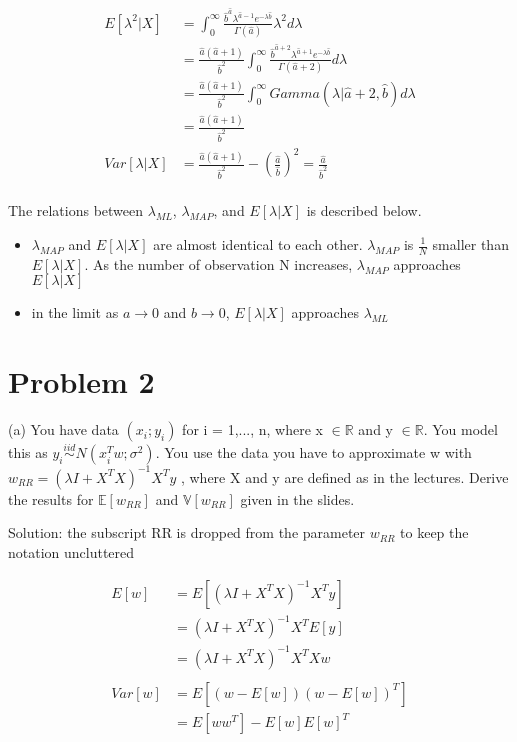 \documentclass[11pt]{report}
\begin{document}
\begin{equation*}
\begin{split}
E[\lambda^2|X] &= \int^{\infty}_0\frac{ \hat{b}^{\hat{a} } \lambda^{\hat{a} - 1} e^{-\lambda\hat{b}}}{\Gamma(\hat{a})} \lambda^2 d\lambda \\
&= \frac{\hat{a} (\hat{a} + 1)}{\hat{b}^2} \int^{\infty}_0 \frac{\hat{b}^{\hat{a} + 2} \lambda^{\hat{a} + 1} e^{-\lambda \hat{b}} }{\Gamma{(\hat{a} + 2)}} d\lambda \\
&= \frac{\hat{a} (\hat{a} + 1)}{\hat{b}^2} \int^{\infty}_0 Gamma(\lambda|\hat{a} + 2, \hat{b}) d\lambda \\
&= \frac{\hat{a} (\hat{a} + 1)}{\hat{b}^2} \\
Var[\lambda|X] &= \frac{\hat{a} (\hat{a} + 1)}{\hat{b}^2}  - (\frac{\hat{a}}{\hat{b}})^2 = \frac{\hat{a}}{\hat{b}^2}
\end{split} 
\end{equation*}
\\
The relations between $\lambda_{ML}$, $\lambda_{MAP}$, and $E[\lambda|X]$ is described below. 
\begin{itemize}
\item $\lambda_{MAP}$ and $E[\lambda|X]$ are almost identical to each other. $\lambda_{MAP}$ is $\frac{1}{N}$ smaller than $E[\lambda|X]$. As the number of observation N increases, $\lambda_{MAP}$ approaches $E[\lambda|X]$
\item in the limit as $a \xrightarrow{} 0$ and $b \xrightarrow{} 0$, $E[\lambda|X]$ approaches $\lambda_{ML}$
\end{itemize}

\section{Problem 2}
(a) You have data $(x_i; y_i)$ for i = 1,..., n, where x $\in  \mathbb{R}$ and y $\in \mathbb{R}$. You model this as $y_i \stackrel{iid}{\sim} N(x_i^Tw; \sigma^2)$. You use the data you have to approximate w with $w_{RR}= (\lambda I + X^TX)^{-1}X^T y$ , where X
and y are defined as in the lectures. Derive the results for $\mathbb{E}[w_{RR}]$ and $\mathbb{V}[w_{RR}]$ given in the slides.

\begin{flushleft}
Solution: the subscript RR is dropped from the parameter $w_{RR}$ to keep the notation uncluttered
\end{flushleft}
\begin{equation*}
\begin{split}
E[w] &=  E[(\lambda I + X^TX)^{-1}X^T y] \\
&= (\lambda I + X^TX)^{-1}X^T E[y] \\
&= (\lambda I + X^TX)^{-1}X^TXw \\
\\
Var[w] &=  E[(w - E[w])(w - E[w])^T] \\
&=  E[w w^T] - E[w]E[w]^T \\
\end{split} 
\end{equation*}
\end{document}
